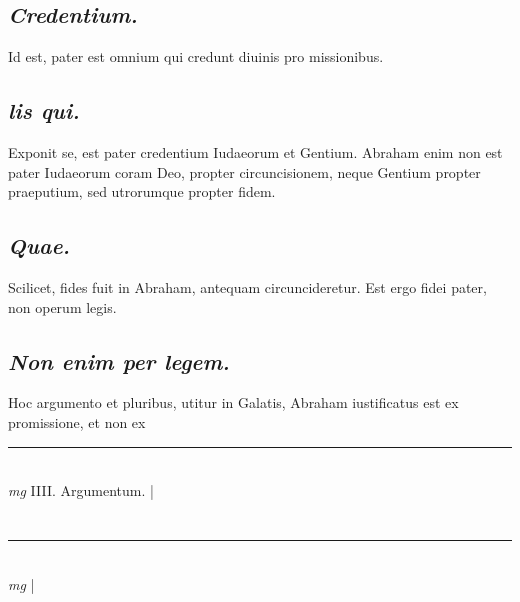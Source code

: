 \documentclass{article}
\begin{document}
\begin{pages}
\subsection*{\textit{Credentium. }}\pstart Id est, pater est omnium qui credunt diuinis pro missionibus.   \pend
{}
{}
\subsection*{\textit{lis qui. }}\pstart Exponit se, est pater credentium Iudaeorum et Gentium. Abraham enim non est pater Iudaeorum coram Deo, propter circuncisionem, neque Gentium propter praeputium, sed utrorumque propter fidem.   \pend
{}
{}
\subsection*{\textit{Quae. }}\pstart Scilicet, fides fuit in Abraham, antequam circuncideretur. Est ergo fidei pater, non operum legis.   \pend
{}
{}
\subsection*{\textit{Non enim per legem. }}\pstart Hoc argumento et pluribus, utitur in Galatis, Abraham iustificatus est ex promissione, et non ex  \pend
\vspace{0.5cm}\noindent
\vspace{0.2cm}\rule{1cm}{0.2pt}\\ 
\hspace{0.2cm}\textit{mg}
\footnotesize IIII. Argumentum.  
\normalsize| 
\section*{ }\pstart                              \pend
\vspace{0.5cm}\noindent
\vspace{0.2cm}\rule{1cm}{0.2pt}\\ 
\hspace{0.2cm}\textit{mg}
\footnotesize 
\normalsize| 
\section*{  }
\marginpar{[ p.]}
{}
\subsection*{\textit{ }}\pstart    \pend
{}
{}

\end{pages}
\end{document}
